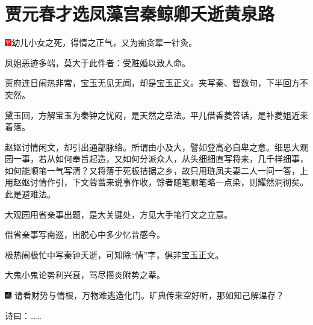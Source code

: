 

\chapter{贾元春才选凤藻宫\hspace{.5em}秦鲸卿夭逝黄泉路}

{\includegraphics[width=3mm]{../Images/00002}\kaishu 幼儿小女之死，得情之正气，又为痴贪辈一针灸。}

{\kaishu 凤姐恶迹多端，莫大于此件者：受赃婚以致人命。}

{\kaishu 贾府连日闹热非常，宝玉无见无闻，却是宝玉正文。夹写秦、智数句，下半回方不突然。}

{\kaishu 黛玉回，方解宝玉为秦钟之忧闷，是天然之章法。平儿借香菱答话，是补菱姐近来着落。}

{\kaishu 赵妪讨情闲文，却引出通部脉络。所谓由小及大，譬如登高必自卑之意。细思大观园一事，若从如何奉旨起造，又如何分派众人，从头细细直写将来，几千样细事，如何能顺笔一气写清？又将落于死板拮据之乡，故只用琏凤夫妻二人一问一答，上用赵妪讨情作引，下文蓉蔷来说事作收，馀者随笔顺笔略一点染，则耀然洞彻矣。此是避难法。}

{\kaishu 大观园用省亲事出题，是大关键处，方见大手笔行文之立意。}

{\kaishu 借省亲事写南巡，出脱心中多少忆昔感今。}

{\kaishu 极热闹极忙中写秦钟夭逝，可知除“情”字，俱非宝玉正文。}

{\kaishu 大鬼小鬼论势利兴衰，骂尽攒炎附势之辈。}

{\includegraphics[width=3mm]{../Images/00005}  \kaishu 请看财势与情根，万物难逃造化门。旷典传来空好听，那如知己解温存？}

诗曰：\ldots{}\ldots{}

